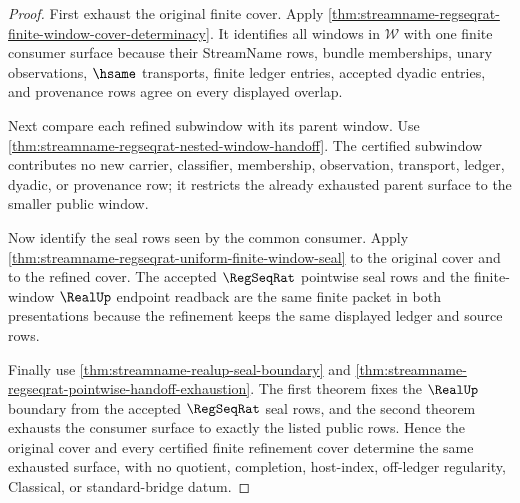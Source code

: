 \begin{proof}
First exhaust the original finite cover. Apply
\autoref{thm:streamname-regseqrat-finite-window-cover-determinacy}. It
identifies all windows in $\mathcal{W}$ with one finite consumer surface
because their StreamName rows, bundle memberships, unary observations,
$\hsame$ transports, finite ledger entries, accepted dyadic entries, and
provenance rows agree on every displayed overlap.

Next compare each refined subwindow with its parent window. Use
\autoref{thm:streamname-regseqrat-nested-window-handoff}. The certified
subwindow contributes no new carrier, classifier, membership, observation,
transport, ledger, dyadic, or provenance row; it restricts the already
exhausted parent surface to the smaller public window.

Now identify the seal rows seen by the common consumer. Apply
\autoref{thm:streamname-regseqrat-uniform-finite-window-seal} to the original
cover and to the refined cover. The accepted $\RegSeqRat$ pointwise seal rows
and the finite-window $\RealUp$ endpoint readback are the same finite packet in
both presentations because the refinement keeps the same displayed ledger and
source rows.

Finally use \autoref{thm:streamname-realup-seal-boundary} and
\autoref{thm:streamname-regseqrat-pointwise-handoff-exhaustion}. The first
theorem fixes the $\RealUp$ boundary from the accepted $\RegSeqRat$ seal rows,
and the second theorem exhausts the consumer surface to exactly the listed
public rows. Hence the original cover and every certified finite refinement
cover determine the same exhausted surface, with no quotient, completion,
host-index, off-ledger regularity, Classical, or standard-bridge datum.
\end{proof}

